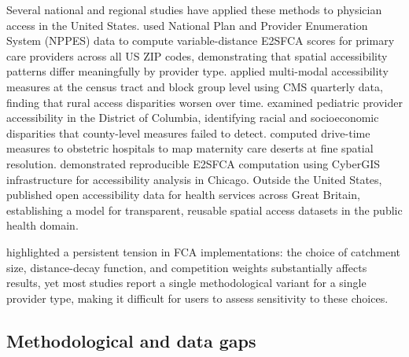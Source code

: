 \documentclass{CUP-JNL-DAP}%
\begin{document}
Several national and regional studies have applied these methods to physician access in the United States. \citet{xia2019} used National Plan and Provider Enumeration System (NPPES) data to compute variable-distance E2SFCA scores for primary care providers across all US ZIP codes, demonstrating that spatial accessibility patterns differ meaningfully by provider type. \citet{buchalter2025} applied multi-modal accessibility measures at the census tract and block group level using CMS quarterly data, finding that rural access disparities worsen over time. \citet{guagliardo2004b} examined pediatric provider accessibility in the District of Columbia, identifying racial and socioeconomic disparities that county-level measures failed to detect. \citet{koschinsky2024} computed drive-time measures to obstetric hospitals to map maternity care deserts at fine spatial resolution. \citet{kang2020} demonstrated reproducible E2SFCA computation using CyberGIS infrastructure for accessibility analysis in Chicago. Outside the United States, \citet{daras2019} published open accessibility data for health services across Great Britain, establishing a model for transparent, reusable spatial access datasets in the public health domain.

\citet{mcgrail2009} highlighted a persistent tension in FCA implementations: the choice of catchment size, distance-decay function, and competition weights substantially affects results, yet most studies report a single methodological variant for a single provider type, making it difficult for users to assess sensitivity to these choices.

\subsection{Methodological and data gaps}
\end{document}
